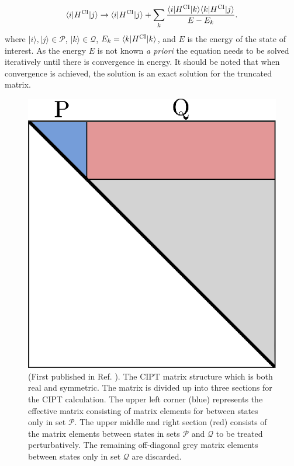 \documentclass[10pt,a4paper, twoside, openright]{report}
\begin{document}
\begin{equation}
\langle i|H^{\rm CI}|j\rangle \rightarrow \langle i|H^{\rm CI}|j\rangle + 
\sum_k \frac{\langle i|H^{\rm CI}|k\rangle\langle k|H^{\rm
    CI}|j\rangle}{E - E_k}. 
    \label{eq:HCI}
\end{equation}
where $|i\rangle, |j\rangle \in \mathcal{P}$, $|k\rangle \in \mathcal{Q}$,  $E_k = \langle k|H^{\rm CI}|k\rangle$, and $E$ is the energy of the state of interest.  As the energy $E$ is not known \textit{a priori} the equation needs to be solved iteratively until there is convergence in energy. It should be noted that when convergence is achieved, the solution is an exact solution for the truncated matrix. 
\begin{figure}
\centering
\includegraphics[scale=1]{./figures/CIPT_matrix.eps}
\caption[CIPT matrix structure.]{(First published in Ref. \cite{DBHF2017}). The CIPT matrix structure which is both real and symmetric. The matrix is divided up into three sections for the CIPT calculation. The upper left corner (blue) represents the effective matrix consisting of matrix elements for between states only in set $\mathcal{P}$. The upper middle and right section (red) consists of the matrix elements between states in sets $\mathcal{P}$ and $\mathcal{Q}$ to be treated perturbatively. The remaining off-diagonal grey matrix elements between states only in set $\mathcal{Q}$ are discarded. \label{fig:CIPT_matrix}}
\end{figure}
\end{document}
